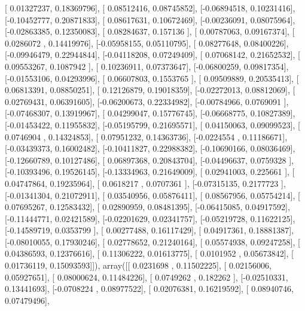 \documentclass{article}
\begin{document}
       [ 0.01327237,  0.18369796],
       [ 0.08512416,  0.08745852],
       [-0.06894518,  0.10231416],
       [-0.10452777,  0.20871833],
       [ 0.08617631,  0.10672469],
       [-0.00236091,  0.08075964],
       [-0.02863385,  0.12350083],
       [ 0.08284637,  0.157136  ],
       [ 0.00787063,  0.09167374],
       [ 0.0286072 ,  0.14419976],
       [-0.05958155,  0.05110795],
       [ 0.08277648,  0.08400226],
       [-0.09946479,  0.22944844],
       [-0.04118208,  0.07249409],
       [ 0.07068142,  0.21652532],
       [ 0.09553267,  0.1087942 ],
       [ 0.10236911,  0.07373647],
       [-0.06800259,  0.09817354],
       [-0.01553106,  0.04293996],
       [ 0.06607803,  0.1553765 ],
       [ 0.09509889,  0.20535413],
       [ 0.06813391,  0.08850251],
       [ 0.12126879,  0.19018359],
       [-0.02272013,  0.08812069],
       [ 0.02769431,  0.06391605],
       [-0.06200673,  0.22334982],
       [-0.00784966,  0.0769091 ],
       [-0.07468307,  0.13919967],
       [ 0.04299047,  0.15776745],
       [-0.06668775,  0.10827389],
       [-0.01453422,  0.11955832],
       [-0.05195799,  0.21695571],
       [ 0.04150063,  0.09099523],
       [ 0.0746904 ,  0.14324853],
       [ 0.07951232,  0.14363736],
       [-0.0224554 ,  0.11186671],
       [-0.03439373,  0.16002482],
       [-0.10411827,  0.22988382],
       [-0.10690166,  0.08036469],
       [-0.12660789,  0.10127486],
       [ 0.06897368,  0.20843704],
       [-0.04496637,  0.0759328 ],
       [-0.10393496,  0.19526145],
       [-0.13334963,  0.21649009],
       [ 0.02941003,  0.225661  ],
       [ 0.04747864,  0.19235964],
       [ 0.0618217 ,  0.0707361 ],
       [-0.07315135,  0.2177723 ],
       [-0.01341304,  0.21072911],
       [ 0.03540956,  0.05876411],
       [ 0.08567956,  0.05754214],
       [ 0.07695267,  0.12583432],
       [ 0.02890959,  0.08481395],
       [-0.06415085,  0.04917592],
       [-0.11444771,  0.02421589],
       [-0.02201629,  0.02341757],
       [-0.05219728,  0.11622125],
       [-0.14589719,  0.0353799 ],
       [ 0.00277488,  0.16117429],
       [ 0.04917361,  0.18881387],
       [-0.08010055,  0.17930246],
       [ 0.02778652,  0.21240164],
       [ 0.05574938,  0.09247258],
       [ 0.04386593,  0.12376616],
       [ 0.11306222,  0.01613775],
       [ 0.0101952 ,  0.05673842],
       [ 0.01736119,  0.15093593]]), array([[ 0.0231698 ,  0.11502225],
       [ 0.02156006,  0.05927651],
       [ 0.08000624,  0.11484226],
       [ 0.0749262 ,  0.182262  ],
       [-0.02510331,  0.13441693],
       [-0.0708224 ,  0.08977522],
       [ 0.02076381,  0.16219592],
       [ 0.08940746,  0.07479496],
\end{document}
